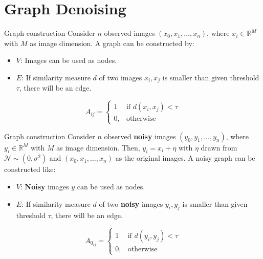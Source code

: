 \documentclass[aspectratio=169]{beamer}
\begin{document}
\section{Graph Denoising}

\begin{frame}{Graph construction}
    Consider $n$ observed images $(x_0, x_1, \dots, x_n)$, where $x_i \in \mathbb{R}^M$ with $M$ as image dimension.
    A graph can be constructed by:
    \begin{itemize}
        \item $V$: Images can be used as nodes.
        \item $E$: If similarity measure $d$ of two images $x_i, x_j$ is smaller than given threshold $\tau$, there will be an edge.
     \end{itemize}

     \pause
     \begin{definition}
        \begin{equation}
            \label{eq:graphConstruction}
            A_{ij} =    
            \begin{cases}
                1  & \text{if } d(x_i, x_j) < \tau\\
                0, & \text{otherwise}
            \end{cases}
        \end{equation}
    \end{definition}
\end{frame}

\begin{frame}{Graph construction}
    Consider $n$ observed \textbf{noisy} images $(y_0, y_1, \dots, y_n)$, where $y_i \in \mathbb{R}^M$ with $M$ as image dimension.
    Then, $y_i = x_i + \eta$ with $\eta$ drawn from $\mathcal{N} \sim (0, \sigma^2)$ and $(x_0, x_1, \dots, x_n)$
    as the original images.
    A noisy graph can be constructed like:
    \begin{itemize}
        \item $V$: \textbf{Noisy} images $y$ can be used as nodes.
        \item $E$: If similarity measure $d$ of two \textbf{noisy} images $y_i, y_j$ is smaller than given threshold $\tau$, there will be an edge.
     \end{itemize}

     \pause

     \begin{definition}
        \begin{equation}
            \label{eq:graphConstructionNoise}
            A_{0_{ij}} =    
            \begin{cases}
                1  & \text{if } d(y_i, y_j) < \tau\\
                0, & \text{otherwise}
            \end{cases}
        \end{equation}    
     \end{definition}
\end{frame}
\end{document}
